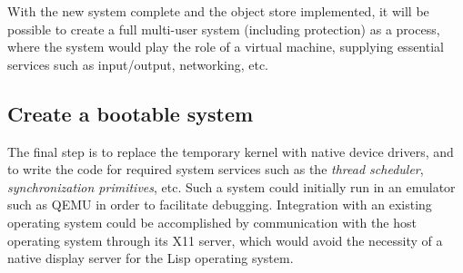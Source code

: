 With the new \commonlisp{} system complete and the object store implemented,
it will be possible to create a full multi-user system (including
protection) as a \unix{} process, where the \unix{} system would play
the role of a virtual machine, supplying essential services such as
input/output, networking, etc. 

\subsection{Create a bootable system}

The final step is to replace the temporary \unix{} kernel with native
device drivers, and to write the code for required system services
such as the \emph{thread scheduler}, \emph{synchronization
  primitives}, etc.  Such a system could initially run in an emulator
such as QEMU in order to facilitate debugging.  Integration with an
existing operating system could be accomplished by communication with
the host operating system through its X11 server, which would avoid
the necessity of a native display server for the Lisp operating
system. 
